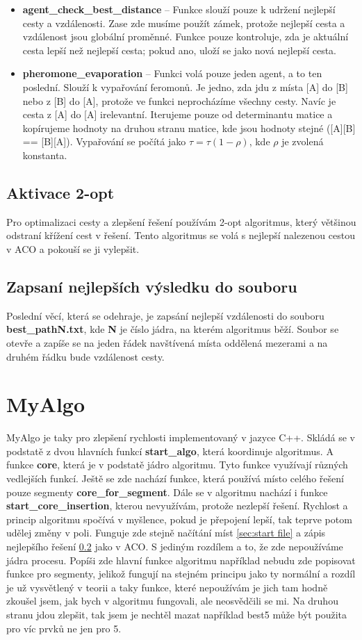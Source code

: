 \begin{itemize}
    \item \textbf{agent\_check\_best\_distance} --
    Funkce slouží pouze k udržení nejlepší cesty a vzdálenosti. Zase zde musíme použít zámek, protože nejlepší cesta a vzdálenost jsou globální proměnné. Funkce pouze kontroluje, zda je aktuální cesta lepší než nejlepší cesta; pokud ano, uloží se jako nová nejlepší cesta.
    
    \item \textbf{pheromone\_evaporation} --
    Funkci volá pouze jeden agent, a to ten poslední. Slouží k vypařování feromonů. Je jedno, zda jdu z místa [A] do [B] nebo z [B] do [A], protože ve funkci neprocházíme všechny cesty. Navíc je cesta z [A] do [A] irelevantní. Iterujeme pouze od determinantu matice a kopírujeme hodnoty na druhou stranu matice, kde jsou hodnoty stejné ([A][B] == [B][A]). Vypařování se počítá jako $\tau=\tau(1-\rho)$, kde $\rho$ je zvolená konstanta.
\end{itemize}
    \subsection{Aktivace 2-opt} 
     Pro optimalizaci cesty a zlepšení řešení používám 2-opt algoritmus, který většinou odstraní křížení cest v řešení. Tento algoritmus se volá s nejlepší nalezenou cestou v ACO a pokouší se ji vylepšit.
    \subsection{Zapsaní nejlepších výsledku do souboru}\label{sec:best file}
    Poslední věcí, která se odehraje, je zapsání nejlepší vzdálenosti do souboru \\ \textbf{best\_pathN.txt}, kde \textbf{N} je číslo jádra, na kterém algoritmus běží. Soubor se otevře a zapíše se na jeden řádek navštívená místa oddělená mezerami a na druhém řádku bude vzdálenost cesty. 

\section{MyAlgo} 
MyAlgo je taky pro zlepšení rychlosti implementovaný v jazyce C++. Skládá se v podstatě z dvou hlavních funkcí \textbf{start\_algo}, která koordinuje algoritmus. A funkce \textbf{core}, která je v podstatě jádro algoritmu. Tyto funkce využívají různých vedlejších funkcí. Ještě se zde nachází funkce, která používá místo celého řešení pouze segmenty \textbf{core\_for\_segment}. Dále se v algoritmu nachází i funkce \textbf{start\_core\_insertion}, kterou nevyužívám, protože nezlepší řešení. Rychlost a princip algoritmu spočívá v myšlence, pokud je přepojení lepší, tak teprve potom udělej změny v poli. Funguje zde stejně načítání míst \ref{sec:start file} a zápis nejlepšího řešení \ref{sec:best file} jako v ACO. S jediným rozdílem a to, že zde nepoužíváme jádra procesu. Popíši zde hlavní funkce algoritmu například nebudu zde popisovat funkce pro segmenty, jelikož fungují na stejném principu jako ty normální a rozdíl je už vysvětlený v teorii a taky funkce, které nepoužívám je jich tam hodně zkoušel jsem, jak bych v algoritmu fungovali, ale neosvědčili se mi. Na druhou stranu jdou zlepšit, tak jsem je nechtěl mazat například best5 může být použita pro víc prvků ne jen pro 5. 
